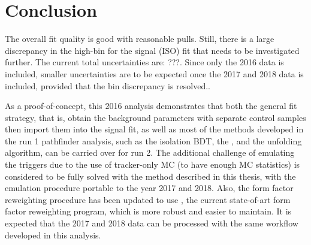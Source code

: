 \chapter{Conclusion}
\label{ref:conclusion}

The overall fit quality is good with reasonable pulls.
Still, there is a large discrepancy in the high-\qSq bin for the \Dstar signal
(ISO) fit that needs to be investigated further.
The current total uncertainties are: ???.
Since only the 2016 data is included,
smaller uncertainties are to be expected once the 2017 and 2018 data is
included,
provided that the \qSq bin discrepancy is resolved..

As a proof-of-concept, this 2016 \RDX analysis demonstrates that both the
general fit strategy, that is, obtain the background parameters with separate
control samples then import them into the signal fit, as well as most of the
methods developed in the run 1 pathfinder analysis,
such as the isolation BDT, the \UBDT, and the unfolding algorithm,
can be carried over for run 2.
The additional challenge of emulating the triggers due to the use of
tracker-only MC (to have enough MC statistics) is considered to be fully solved
with the method described in this thesis, with the emulation procedure portable
to the year 2017 and 2018.
Also, the form factor reweighting procedure has been updated to use \Hammer,
the current state-of-art form factor reweighting program,
which is more robust and easier to maintain.
It is expected that the 2017 and 2018 data can be processed with the same
workflow developed in this analysis.
